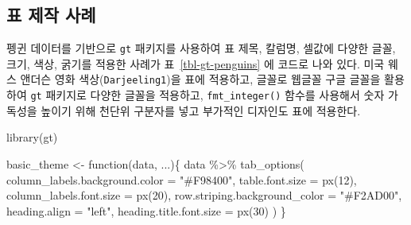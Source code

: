 \documentclass[
  letterpaper,
]{book}
\newenvironment{Shaded}{\begin{snugshade}}{\end{snugshade}}
\newcommand{\AttributeTok}[1]{\textcolor[rgb]{0.40,0.45,0.13}{#1}}
\newcommand{\ControlFlowTok}[1]{\textcolor[rgb]{0.00,0.23,0.31}{#1}}
\newcommand{\DecValTok}[1]{\textcolor[rgb]{0.68,0.00,0.00}{#1}}
\newcommand{\FunctionTok}[1]{\textcolor[rgb]{0.28,0.35,0.67}{#1}}
\newcommand{\NormalTok}[1]{\textcolor[rgb]{0.00,0.23,0.31}{#1}}
\newcommand{\OtherTok}[1]{\textcolor[rgb]{0.00,0.23,0.31}{#1}}
\newcommand{\SpecialCharTok}[1]{\textcolor[rgb]{0.37,0.37,0.37}{#1}}
\newcommand{\StringTok}[1]{\textcolor[rgb]{0.13,0.47,0.30}{#1}}
\begin{document}
\hypertarget{uxd45c-uxc81cuxc791-uxc0acuxb840}{%
\subsection{표 제작 사례}\label{uxd45c-uxc81cuxc791-uxc0acuxb840}}

펭귄 데이터를 기반으로 \texttt{gt} 패키지를 사용하여 표 제목, 칼럼명,
셀값에 다양한 글꼴, 크기, 색상, 굵기를 적용한 사례가
표~\ref{tbl-gt-penguins} 에 코드로 나와 있다. 미국 웨스 앤더슨 영화
색상(\texttt{Darjeeling1})을 표에 적용하고, 글꼴로 웹글꼴 구글 글꼴을
활용하여 \texttt{gt} 패키지로 다양한 글꼴을 적용하고,
\texttt{fmt\_integer()} 함수를 사용해서 숫자 가독성을 높이기 위해 천단위
구분자를 넣고 부가적인 디자인도 표에 적용한다.

\begin{Shaded}
\begin{Highlighting}[]
\FunctionTok{library}\NormalTok{(gt)}

\NormalTok{basic\_theme }\OtherTok{\textless{}{-}} \ControlFlowTok{function}\NormalTok{(data, ...)\{}
\NormalTok{  data }\SpecialCharTok{\%\textgreater{}\%} 
    \FunctionTok{tab\_options}\NormalTok{(}
      \AttributeTok{column\_labels.background.color =} \StringTok{"\#F98400"}\NormalTok{,}
      \AttributeTok{table.font.size =} \FunctionTok{px}\NormalTok{(}\DecValTok{12}\NormalTok{),}
      \AttributeTok{column\_labels.font.size =} \FunctionTok{px}\NormalTok{(}\DecValTok{20}\NormalTok{),}
      \AttributeTok{row.striping.background\_color =} \StringTok{"\#F2AD00"}\NormalTok{,}
      \AttributeTok{heading.align =} \StringTok{"left"}\NormalTok{,}
      \AttributeTok{heading.title.font.size =} \FunctionTok{px}\NormalTok{(}\DecValTok{30}\NormalTok{)}
\NormalTok{  )}
\NormalTok{\}}


\end{Highlighting}
\end{Shaded}
\end{document}
